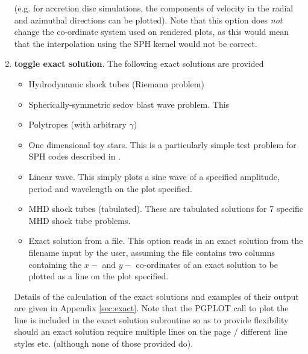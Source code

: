 \documentclass[a4paper,12pt]{article}
\begin{document}
\begin{enumerate}
(e.g. for accretion disc simulations, the components of velocity in the radial
and azimuthal directions can be plotted). Note that this option does \emph{not} change
the co-ordinate system used on rendered plots, as this would mean that the interpolation using the SPH
kernel would not be correct.  
\item \textbf{toggle exact solution}. The following exact solutions are provided
\begin{itemize}
\item Hydrodynamic shock tubes (Riemann problem)
\item Spherically-symmetric sedov blast wave problem. This
\item Polytropes (with arbitrary $\gamma$)
\item One dimensional toy stars. This is a particularly simple test
problem for SPH codes described in \citet{mp04}.
\item Linear wave. This simply plots a sine wave of a specified amplitude, period and
wavelength on the plot specified.
\item MHD shock tubes (tabulated). These are tabulated solutions for 7 specific MHD
shock tube problems.
\item Exact solution from a file. This option reads in an exact solution from the
filename input by the user, assuming the file contains two columns containing the $x-$ and $y-$ co-ordinates of
an exact solution to be plotted as a line on the plot specified.
\end{itemize}
Details of the calculation of the exact solutions and examples of their output are
given in Appendix \ref{sec:exact}. Note that the PGPLOT call to plot the line is included in the
exact solution subroutine so as to provide flexibility should an exact solution require
multiple lines on the page / different line styles etc. (although none of those
provided do).
\end{enumerate}
\end{document}
